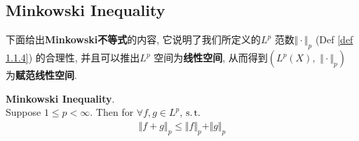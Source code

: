  \newpage
 
 \subsection{Minkowski Inequality}
 	下面给出\textbf{Minkowski不等式}的内容, 它说明了我们所定义的$L^p$ 范数$\Vert \cdot \Vert_p$ (Def \ref{def 1.1.4}) 的合理性, 并且可以推出$L^p$ 空间为\textbf{线性空间}, 从而得到$(L^p(X) , \,\, \Vert \cdot \Vert_p)$ 为\textbf{赋范线性空间}.
 	\begin{thm}\label{thm 1.1.4}
 		\textbf{Minkowski Inequality}. \\
 		Suppose $1 \leq p < \infty$. Then for $\forall f , g \in L^p$, $\operatorname{s.t.}$
 		\begin{align}
 			\Vert f + g \Vert_p \leq \Vert f \Vert_p + \Vert g \Vert_p
 		\end{align}
 		

\end{thm}
